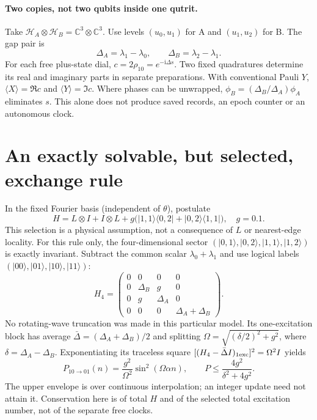 \documentclass[11pt,a4paper]{article}
\newcommand{\ii}{\mathrm i}
\newcommand{\ket}[1]{|#1\rangle}
\newcommand{\bra}[1]{\langle#1|}
\begin{document}
\paragraph{Two copies, not two qubits inside one qutrit.}
Take $\mathcal H_A\otimes\mathcal H_B=\mathbb C^3\otimes\mathbb C^3$.
Use levels $(u_0,u_1)$ for A and $(u_1,u_2)$ for B. The gap pair is
\begin{equation}
 \Delta_A=\lambda_1-\lambda_0,\qquad
 \Delta_B=\lambda_2-\lambda_1.\label{gaps}
\end{equation}
For each free plus-state dial, $c=2\rho_{10}=e^{-\ii\Delta s}$.
Two fixed quadratures determine its real and imaginary parts in
separate preparations. With conventional Pauli $Y$, $\langle X\rangle
=\Re c$ and $\langle Y\rangle=\Im c$. Where phases can be unwrapped,
$\phi_B=(\Delta_B/\Delta_A)\phi_A$ eliminates $s$. This alone does
not produce saved records, an epoch counter or an autonomous clock.

\newpage
\section{An exactly solvable, but selected, exchange rule}
In the fixed Fourier basis (independent of $\theta$), postulate
\begin{equation}
 H=L\otimes I+I\otimes L+
 g\big(\ket{1,1}\bra{0,2}+\ket{0,2}\bra{1,1}\big),\quad g=0.1.
 \label{selected}
\end{equation}
This selection is a physical assumption, not a consequence of $L$ or
nearest-edge locality. For this rule only, the four-dimensional sector
$(\ket{0,1},\ket{0,2},\ket{1,1},\ket{1,2})$ is exactly invariant.
Subtract the common scalar $\lambda_0+\lambda_1$ and use logical labels
$(\ket{00},\ket{01},\ket{10},\ket{11})$:
\begin{equation}
 H_4=\begin{pmatrix}
 0&0&0&0\\0&\Delta_B&g&0\\0&g&\Delta_A&0\\
 0&0&0&\Delta_A+\Delta_B
 \end{pmatrix}.\label{H4}
\end{equation}
No rotating-wave truncation was made in this particular model. Its
one-excitation block has average $\bar\Delta=(\Delta_A+\Delta_B)/2$
and splitting $\Omega=\sqrt{(\delta/2)^2+g^2}$, where
$\delta=\Delta_A-\Delta_B$. Exponentiating its traceless square
$[(H_4-\bar\Delta I)_{1\rm exc}]^2=\Omega^2 I$ yields
\begin{equation}
 P_{10\to01}(n)=\frac{g^2}{\Omega^2}\sin^2(\Omega\alpha n),\qquad
 P\leq\frac{4g^2}{\delta^2+4g^2}.\label{exchange}
\end{equation}
The upper envelope is over continuous interpolation; an integer
update need not attain it. Conservation here is of total $H$ and of
the selected total excitation number, not of the separate free clocks.
\end{document}
